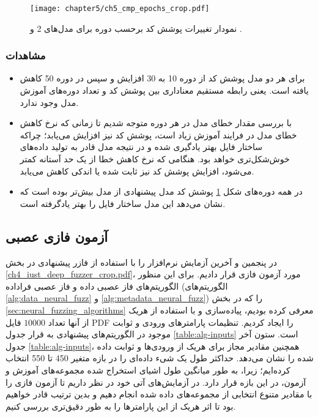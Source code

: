  \begin{figure}%
	\centering
	\texttt{[image: chapter5/ch5\_cmp\_epochs\_crop.pdf]}
	\caption
	{
		نمودار تغییرات پوشش کد برحسب دوره برای مدل‌های 2 و .
	}
	\label{ch5_cmp_epochs_crop.pdf}
\end{figure}

\subsubsection{مشاهدات}
\begin{itemize}
	\item{
برای هر دو مدل پوشش کد از دوره 10 به 30 افزایش و سپس در دوره 50 کاهش یافته است. یعنی رابطه مستقیم معناداری بین پوشش کد و تعداد دوره‌های آموزش مدل وجود ندارد. 	

}
\item{
با بررسی مقدار خطای مدل در هر دوره متوجه شدیم تا زمانی که نرخ کاهش خطای مدل در فرایند آموزش زیاد است، پوشش کد نیز افزایش می‌یابد؛ چراکه ساختار فایل بهتر یادگیری شده و در نتیجه مدل قادر به تولید داده‌های خوش‌شکل‌تری خواهد بود. هنگامی که نرخ کاهش خطا از یک حد آستانه کمتر می‌شود، افزایش پوشش کد نیز ثابت شده یا اندکی کاهش می‌یابد. 
}

\item{
	در همه دوره‌های شکل \ref{ch5_cmp_epochs_crop.pdf} پوشش کد مدل پیشنهادی از مدل  بیش‌تر بوده است که نشان می‌دهد این مدل ساختار فایل را بهتر یادگرفته است. 
}
	
\end{itemize}

\subsection{آزمون فازی عصبی}
در پنجمین و آخرین آزمایش نرم‌افزار  را با استفاده از فازر پیشنهادی در بخش \ref{ch4_iust_deep_fuzzer_crop.pdf}، مورد آزمون فازی قرار دادیم. برای این منظور الگوریتم‌های فاز عصبی داده و فاز عصبی فراداده (الگوریتم‌های \ref{alg:data_neural_fuzz} و \ref{alg:metadata_neural_fuzz}) را که در بخش \ref{sec:neural_fuzzing_algorithms} معرفی کرده بودیم، پیاده‌سازی و با استفاده از هریک از آنها تعداد $10000$ فایل \gls{PDF} را ایجاد کردیم. تنظیمات پارامترهای ورودی و ثوابت موجود در الگوریتم‌های پیشنهادی به قرار جدول 
\ref{table:alg-inputs}
 است. ستون آخر جدول
\ref{table:alg-inputs}،
همچنین مقادیر مجاز برای هریک از ورودی‌ها و ثوابت داده شده را نشان می‌دهد. حداکثر طول یک شیء داده‌ای 
را در بازه متغیر 450 تا 550 انتخاب کرده‌ایم؛ زیرا، به طور میانگین طول اشیای استخراج شده مجموعه‌های آموزش و آزمون، در این بازه قرار دارد.
در آزمایش‌های آتی خود در نظر داریم تا آزمون فازی را با مقادیر متنوع انتخابی از مجموعه‌های داده شده انجام دهیم و بدین ترتیب قادر خواهیم بود تا اثر هریک از این پارامترها را به طور دقیق‌تری بررسی کنیم.


